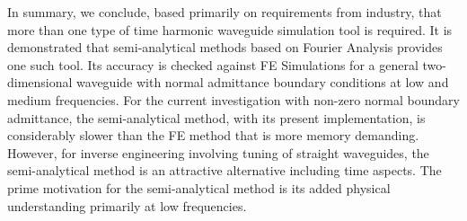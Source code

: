 \documentclass[numreferences]{kluwer}
\begin{document}
In summary, we conclude, based primarily on requirements from industry, that more than one type of time harmonic waveguide simulation tool is required. It is demonstrated that semi-analytical methods based on Fourier Analysis provides one such tool. Its accuracy is checked against FE Simulations for a general two-dimensional waveguide with normal admittance boundary conditions at low and medium frequencies. For the current investigation with non-zero normal boundary admittance, the semi-analytical method, with its present implementation, is considerably slower than the FE method that is more memory demanding. However, for inverse engineering involving tuning of straight waveguides, the semi-analytical method is an attractive alternative including time aspects. The prime motivation for the semi-analytical method is its added physical understanding primarily at low frequencies.







\end{document}
